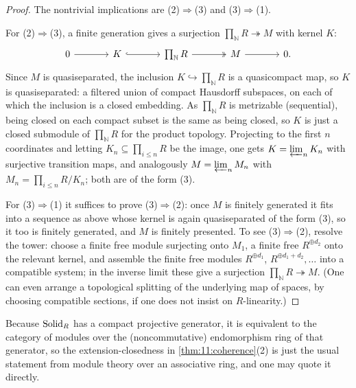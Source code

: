 \begin{proof}
The nontrivial implications are (2)$\Rightarrow$(3) and (3)$\Rightarrow$(1).

For (2)$\Rightarrow$(3), a finite generation gives a surjection
$\prod_{\mathbb{N}}R\twoheadrightarrow M$ with kernel $K$:
\[
\begin{tikzcd}[column sep=large]
0 \arrow[r] & K \arrow[r, hook] & \prod_{\mathbb{N}}R \arrow[r, two heads] & M
\arrow[r] & 0.
\end{tikzcd}
\]
Since $M$ is quasiseparated, the inclusion $K\hookrightarrow\prod_{\mathbb{N}}R$
is a quasicompact map, so $K$ is quasiseparated: a filtered union of compact
Hausdorff subspaces, on each of which the inclusion is a closed embedding. As
$\prod_{\mathbb{N}}R$ is metrizable (sequential), being closed on each compact
subset is the same as being closed, so $K$ is just a closed submodule of
$\prod_{\mathbb{N}}R$ for the product topology. Projecting to the first $n$
coordinates and letting $K_{n}\subseteq\prod_{i\le n}R$ be the image, one gets
$K=\varprojlim_{n}K_{n}$ with surjective transition maps, and analogously
$M=\varprojlim_{n}M_{n}$ with $M_{n}=\prod_{i\le n}R/K_{n}$; both are of the
form (3).

For (3)$\Rightarrow$(1) it suffices to prove (3)$\Rightarrow$(2): once $M$ is
finitely generated it fits into a sequence as above whose kernel is again
quasiseparated of the form (3), so it too is finitely generated, and $M$ is
finitely presented. To see (3)$\Rightarrow$(2), resolve the tower: choose a
finite free module surjecting onto $M_{1}$, a finite free $R^{\oplus d_{2}}$
onto the relevant kernel, and assemble the finite free modules $R^{\oplus
d_{1}}$, $R^{\oplus d_{1}+d_{2}},\dots$ into a compatible system; in the inverse
limit these give a surjection $\prod_{\mathbb{N}}R\twoheadrightarrow M$. (One
can even arrange a topological splitting of the underlying map of spaces, by
choosing compatible sections, if one does not insist on $R$-linearity.)
\end{proof}

\begin{remark}
\label{rmk:11:endomorphism}
Because $\mathrm{Solid}_{R}$ has a compact projective generator, it is equivalent to
the category of modules over the (noncommutative) endomorphism ring of that
generator, so the extension-closedness in \cref{thm:11:coherence}(2) is just
the usual statement from module theory over an associative ring, and one may
quote it directly.
\end{remark}

